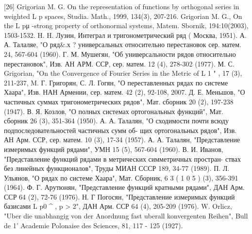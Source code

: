 \documentclass[15pt]{article}
\begin{document}
{{{{[26] Grigorian M. G. On the representation of functions by orthogonal series
in weighted L p spaces, Studia. Math., 1999, 134(3), 207-216.
\newline
[27] Grigorian M. G., On the L pμ -strong property of orthonormal systems,
Matem. Sbornik, 194:10(2003), 1503-1532.
\newline
[28] H. H. Лузин, Интеграл
и тригонометрический
ряд ( Москва, 1951).
\newline
[29] А. А. Талаляе, "О ряд&.х ? универсальных относительно перестановок
сер. матем. 24, 567-604 (1960).
\newline
[30] Г. М. Мушегян, "Об универсальности рядов относительно перестановок", Изв. АН АРМ.
ССР, сер. матем. 12 (4), 278-302 (1977).
\newline
[31] М. С. Grigorian, "On the Convergence of Fourier Series in the Metric of L 1 " , 17 (3), 211-237,
\newline
[32] M. Г. Григорян, С. Л. Гогян, "О переставленных рядах по системе Хаара", Изв. НАН
Армении, сер. матем. 42 (2), 92-108, 2007.
\newline
[33] Д. Е. Меньшов, "О частичных суммах тригонометрических рядов", Мат. сборник 20 (2),
197-238 (1947).
\newline
[34] В. Я. Козлов, "О полных системах ортогональных функций", Мат. сборник 26 (3), 351-364
(1950).
\newline
[35] А. А. Талалян, "О сходимости почти всюду подпоследовательностей частичных сумм об-
щих ортогональных рядов", Изв. АН Арм. ССР, сер. матем. 10 (3), 17-34 (1957).
\newline
[36] А. А. Талалян, "Представление измеримых функций рядами", УМН 15 (5), 567-604 (1960).
\newline
[37] В. И. Иванов, "Представление функций рядами в метрических симметричных простран-
ствах без линейных функционалов", Труды МИАН СССР 189, 34-77 (1989).
\newline
[38] П. Л. Ульянов, "О рядах по системе Хаара", Мат. Сборник, 6 3 ( 1 0 5 ) (3), 356-391 (1964).
\newline
[39] Ф. Г. Арутюнян, "Представление функций кратными рядами", ДАН Арм. ССР 64 (2),
72-76 (1976).
\newline
[40] Н. Г Погосян, "Представление измеримых функций базисами L p0 ^ , p > 2", ДАН Арм.
ССР 64 (4), 205-209 (1976).
\newline
[41] W. Orlicz, "Uber die unabhangig von der Anordnung fast uberall konvergenten Reihen", Bull
de 1' Academie Polonaise des Sciences, 81, 117 - 125 (1927).

}}}}
\end{document}
